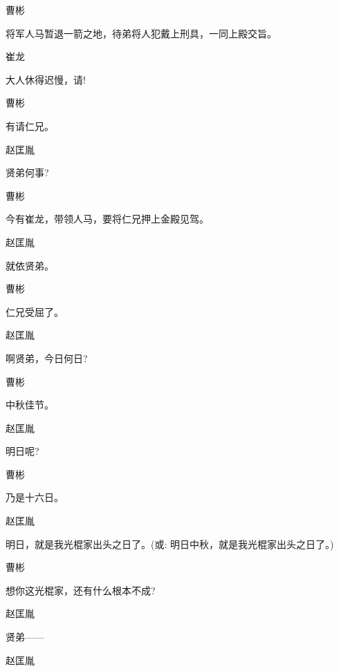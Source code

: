{曹彬\hspace{30pt}~

将军人马暂退一箭之地，待弟将人犯戴上刑具，一同上殿交旨。}

{崔龙\hspace{30pt}~

大人休得迟慢，请!}

{曹彬\hspace{30pt}~

有请仁兄。}

{赵匡胤\hspace{20pt}~

贤弟何事?}

{曹彬\hspace{30pt}~

今有崔龙，带领人马，要将仁兄押上金殿见驾。}

{赵匡胤\hspace{20pt}~

就依贤弟。}

{曹彬\hspace{30pt}~

仁兄受屈了。}

{赵匡胤\hspace{20pt}~

啊贤弟，今日何日?}

{曹彬\hspace{30pt}~

中秋佳节。}

{赵匡胤\hspace{20pt}~

明日呢?}

{曹彬\hspace{30pt}~

乃是十六日。}

{赵匡胤

明日，就是我光棍家出头之日了。({\akai 或}: 明日中秋，就是我光棍家出头之日了。)}

{曹彬\hspace{30pt}~

想你这光棍家，还有什么根本不成?}

{赵匡胤\hspace{20pt}~

贤弟------}

{赵匡胤\hspace{20pt}~

 }

